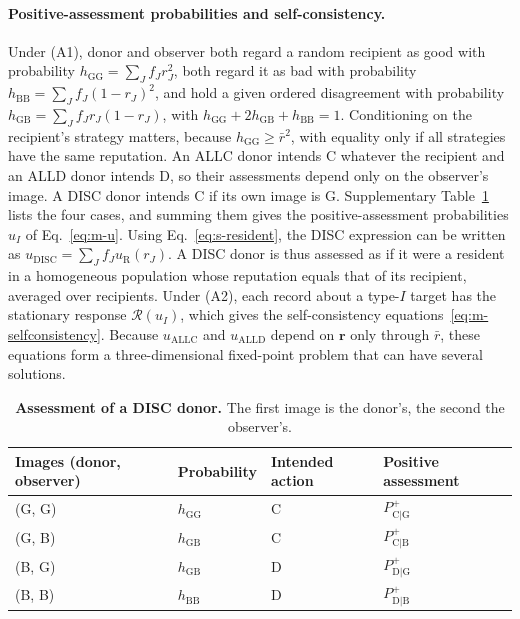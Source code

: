 \documentclass[fleqn,10pt]{wlscirep}
\newcommand{\Rmap}{\mathscr{R}}            %
\newcommand{\Pp}[1]{P^{+}_{\mathrm{#1}}}   %
\newcommand{\ALLC}{\mathrm{ALLC}}
\newcommand{\ALLD}{\mathrm{ALLD}}
\newcommand{\DISC}{\mathrm{DISC}}
\theoremstyle{plain}
\begin{document}
\paragraph{Positive-assessment probabilities and self-consistency.} Under (A1), donor and observer both regard a random recipient as good with probability $h_{\mathrm{GG}}=\sum_Jf_Jr_J^2$, both regard it as bad with probability $h_{\mathrm{BB}}=\sum_Jf_J(1-r_J)^2$, and hold a given ordered disagreement with probability $h_{\mathrm{GB}}=\sum_Jf_Jr_J(1-r_J)$, with $h_{\mathrm{GG}}+2h_{\mathrm{GB}}+h_{\mathrm{BB}}=1$. Conditioning on the recipient's strategy matters, because $h_{\mathrm{GG}}\geq\bar r^2$, with equality only if all strategies have the same reputation. An ALLC donor intends C whatever the recipient and an ALLD donor intends D, so their assessments depend only on the observer's image. A DISC donor intends C if its own image is G. Supplementary Table~\ref{tab:si-disc} lists the four cases, and summing them gives the positive-assessment probabilities $u_I$ of Eq.~\eqref{eq:m-u}. Using Eq.~\eqref{eq:s-resident}, the DISC expression can be written as $u_{\DISC}=\sum_Jf_Ju_{\mathrm R}(r_J)$. A DISC donor is thus assessed as if it were a resident in a homogeneous population whose reputation equals that of its recipient, averaged over recipients. Under (A2), each record about a type-$I$ target has the stationary response $\Rmap(u_I)$, which gives the self-consistency equations~\eqref{eq:m-selfconsistency}. Because $u_{\ALLC}$ and $u_{\ALLD}$ depend on $\bm r$ only through $\bar r$, these equations form a three-dimensional fixed-point problem that can have several solutions.

\begin{table}[!htbp]
\centering
\caption{\textbf{Assessment of a DISC donor.} The first image is the donor's, the second the observer's.}
\label{tab:si-disc}
\small
\begin{tabular}{@{}llll@{}}
\toprule
Images (donor, observer) & Probability & Intended action & Positive assessment\\
\midrule
(G, G) & $h_{\mathrm{GG}}$ & C & $\Pp{C|G}$\\
(G, B) & $h_{\mathrm{GB}}$ & C & $\Pp{C|B}$\\
(B, G) & $h_{\mathrm{GB}}$ & D & $\Pp{D|G}$\\
(B, B) & $h_{\mathrm{BB}}$ & D & $\Pp{D|B}$\\
\bottomrule
\end{tabular}
\end{table}
\end{document}
